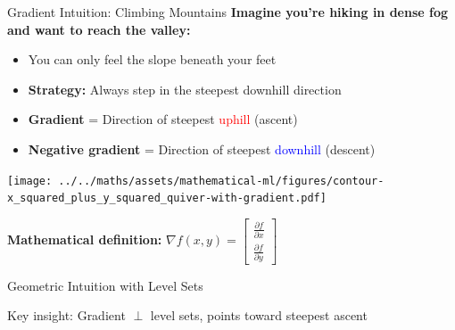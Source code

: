 \documentclass[usenames,dvipsnames]{beamer}
\begin{document}
  \begin{frame}{Gradient Intuition: Climbing Mountains}
    \textbf{Imagine you're hiking in dense fog and want to reach the valley:}
    
    \begin{itemize}[<+->]
        \item You can only feel the slope beneath your feet
        \item \textbf{Strategy:} Always step in the steepest downhill direction
        \item \textbf{Gradient} = Direction of steepest \textcolor{red}{uphill} (ascent)
        \item \textbf{Negative gradient} = Direction of steepest \textcolor{blue}{downhill} (descent)
    \end{itemize}
    
    \pause
    \begin{center}
    \texttt{[image: ../../maths/assets/mathematical-ml/figures/contour-x\_squared\_plus\_y\_squared\_quiver-with-gradient.pdf]}
    \end{center}
    
    \pause
    \textbf{Mathematical definition:} $\nabla f(x, y) = \begin{bmatrix} \frac{\partial f}{\partial x} \\ \frac{\partial f}{\partial y} \end{bmatrix}$
  \end{frame}

  \begin{frame}{Geometric Intuition with Level Sets}
    \begin{center}
    \end{center}

    \begin{keypointsbox}
    Key insight: Gradient $\perp$ level sets, points toward steepest ascent
    \end{keypointsbox}
  \end{frame}
\end{document}
